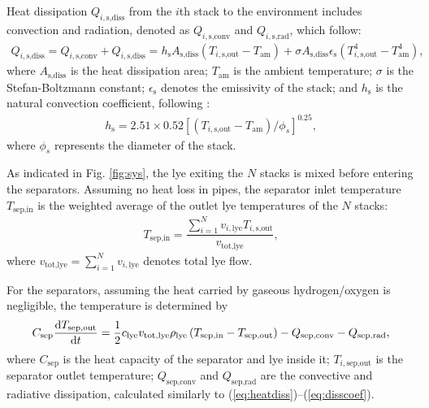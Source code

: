 \documentclass[review,3p,10pt]{elsarticle}
\begin{document}
Heat dissipation $Q_{i,\text{s,diss}}$ from the $i$th stack to the environment includes convection and radiation, denoted as $Q_{i,\text{s,conv}}$ and $Q_{i,\text{s,rad}}$, which follow:
\begin{align}
  Q_{i,\text{s,diss}} = Q_{i,\text{s,conv}} + Q_{i,\text{s,diss}} = h_\text{s} A_{\text{s,diss}} ( T_{i,\text{s,out}} - T_\text{am}) + \sigma A_{\text{s,diss}} \epsilon_\text{s} ( T^4_{i,\text{s,out}} - T^4_\text{am} ), \label{eq:heatdiss}
\end{align}
where %
$A_{\text{s,diss}}$ is the %
 heat dissipation area; %
$T_\text{am}$ is the ambient temperature; $\sigma$ is the Stefan-Boltzmann constant; $\epsilon_\text{s}$ denotes the emissivity of the stack; and $h_\text{s}$ is the natural convection %
coefficient, %
following \cite{dieguez2008thermal}:
\begin{align}
  h_\text{s} = 2.51 \times 0.52 \left[ \left( {T_{i,\text{s,out}} - T_{\text{am}}}  \right) / {\phi_{s}} \right]^{0.25}, \label{eq:disscoef}
\end{align}
where $\phi_{s}$ represents the diameter of the stack.

As indicated in Fig. \ref{fig:sys}, the lye exiting the $N$ stacks is mixed before entering the separators. Assuming no heat loss in pipes, the separator inlet temperature $T_{\text{sep,in}}$ is the weighted average of the outlet lye temperatures of the $N$ stacks: %
\begin{align}
  T_{\text{sep,in}} = \dfrac{ \sum_{i=1}^N v_{i,\text{lye}} T_{i,\text{s,out}} } {v_{\text{tot,lye}}},
\end{align}
where %
$v_{\text{tot,lye}} = \sum_{i=1}^N v_{i,\text{lye}}$ denotes total lye flow.

For the separators, assuming the heat carried by gaseous hydrogen/oxygen is negligible, the temperature is determined by %
\begin{align}
  C_{\text{sep}} \dfrac{{\text{d}}T_{\text{sep,out}}}{\text{d}t} = \frac{1}{2} c_{\text{lye}} v_{\text{tot,lye}} \rho_{\rm{lye}} \left( T_{\text{sep,in}} - T_{\text{sep,out}} \right) - Q_{\text{sep,conv}} - Q_{\text{sep,rad}}  , \label{heatseparator}
\end{align}
where $C_{\text{sep}}$ is the heat capacity of the separator and lye inside it; $T_{i,\text{sep,out}}$ is the separator outlet temperature; $Q_{\text{sep,conv}}$ and $Q_{\text{sep,rad}}$ are the convective and radiative dissipation, calculated similarly to (\ref{eq:heatdiss})--(\ref{eq:disscoef}). %
\end{document}
